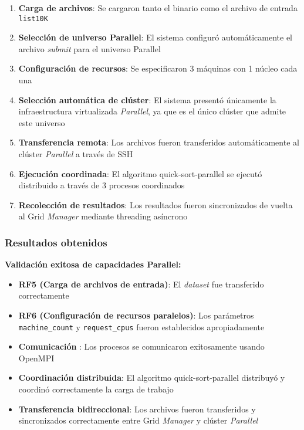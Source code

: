 \begin{enumerate}
	\item \textbf{Carga de archivos}: Se cargaron tanto el binario \MPI como el archivo de entrada \texttt{list10K}

	\item \textbf{Selección de universo Parallel}: El sistema configuró automáticamente el archivo \textit{submit} para el universo Parallel

	\item \textbf{Configuración de recursos}: Se especificaron 3 máquinas con 1 núcleo cada una

	\item \textbf{Selección automática de clúster}: El sistema presentó únicamente la infraestructura virtualizada \textit{Parallel}, ya que es el único clúster que admite este universo

	\item \textbf{Transferencia remota}: Los archivos fueron transferidos automáticamente al clúster \textit{Parallel} a través de SSH

	\item \textbf{Ejecución coordinada}: El algoritmo quick-sort-parallel se ejecutó distribuido a través de 3 procesos \MPI coordinados

	\item \textbf{Recolección de resultados}: Los resultados fueron sincronizados de vuelta al Grid \textit{Manager} mediante threading asíncrono
\end{enumerate}

\subsubsection{Resultados obtenidos}
\noindent

\textbf{Validación exitosa de capacidades Parallel:}

\begin{itemize}
	\item \textbf{RF5 (Carga de archivos de entrada)}: El \textit{dataset} fue transferido correctamente
	\item \textbf{RF6 (Configuración de recursos paralelos)}: Los parámetros \texttt{machine\_count} y \texttt{request\_cpus} fueron establecidos apropiadamente
	\item \textbf{Comunicación \MPI}: Los procesos se comunicaron exitosamente usando OpenMPI
	\item \textbf{Coordinación distribuida}: El algoritmo quick-sort-parallel distribuyó y coordinó correctamente la carga de trabajo
	\item \textbf{Transferencia bidireccional}: Los archivos fueron transferidos y sincronizados correctamente entre Grid \textit{Manager} y clúster \textit{Parallel}
\end{itemize}

